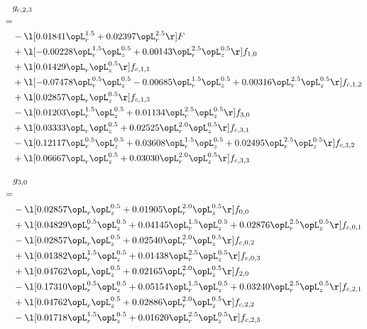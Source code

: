 \begin{alignat}{2} 
\label{eq:g_23_0} 
& g_{c,2,3} \nonumber \\ 
 = \\ 
& - \l[  0.01841 \opL_r^{1.5} +  0.02397 \opL_r^{2.5}  \r] F \nonumber \\ 
& + \l[  -0.00228 \opL_r^{1.5} \opL_z^{0.5} +  0.00143 \opL_r^{2.5} \opL_z^{0.5}  \r] f_{1,0} \nonumber \\ 
& + \l[  0.01429 \opL_r \opL_z^{0.5}  \r] f_{c,1,1} \nonumber \\ 
& + \l[  -0.07478 \opL_r^{0.5} \opL_z^{0.5}   -0.00685 \opL_r^{1.5} \opL_z^{0.5} +  0.00316 \opL_r^{2.5} \opL_z^{0.5}  \r] f_{c,1,2} \nonumber \\ 
& + \l[  0.02857 \opL_r \opL_z^{0.5}  \r] f_{c,1,3} \nonumber \\ 
& - \l[  0.01203 \opL_r^{1.5} \opL_z^{0.5} +  0.01134 \opL_r^{2.5} \opL_z^{0.5}  \r] f_{3,0} \nonumber \\ 
& + \l[  0.03333 \opL_r \opL_z^{0.5} +  0.02525 \opL_r^{2.0} \opL_z^{0.5}  \r] f_{c,3,1} \nonumber \\ 
& - \l[  0.12117 \opL_r^{0.5} \opL_z^{0.5} +  0.03608 \opL_r^{1.5} \opL_z^{0.5} +  0.02495 \opL_r^{2.5} \opL_z^{0.5}  \r] f_{c,3,2} \nonumber \\ 
& + \l[  0.06667 \opL_r \opL_z^{0.5} +  0.03030 \opL_r^{2.0} \opL_z^{0.5}  \r] f_{c,3,3} \nonumber \\ 
\end{alignat} 


\begin{alignat}{2} 
\label{eq:g_30_0} 
& g_{3,0} \nonumber \\ 
 = \\ 
& - \l[  0.02857 \opL_r \opL_z^{0.5} +  0.01905 \opL_r^{2.0} \opL_z^{0.5}  \r] f_{0,0} \nonumber \\ 
& + \l[  0.04829 \opL_r^{0.5} \opL_z^{0.5} +  0.04145 \opL_r^{1.5} \opL_z^{0.5} +  0.02876 \opL_r^{2.5} \opL_z^{0.5}  \r] f_{c,0,1} \nonumber \\ 
& - \l[  0.02857 \opL_r \opL_z^{0.5} +  0.02540 \opL_r^{2.0} \opL_z^{0.5}  \r] f_{c,0,2} \nonumber \\ 
& + \l[  0.01382 \opL_r^{1.5} \opL_z^{0.5} +  0.01438 \opL_r^{2.5} \opL_z^{0.5}  \r] f_{c,0,3} \nonumber \\ 
& + \l[  0.04762 \opL_r \opL_z^{0.5} +  0.02165 \opL_r^{2.0} \opL_z^{0.5}  \r] f_{2,0} \nonumber \\ 
& - \l[  0.17310 \opL_r^{0.5} \opL_z^{0.5} +  0.05154 \opL_r^{1.5} \opL_z^{0.5} +  0.03240 \opL_r^{2.5} \opL_z^{0.5}  \r] f_{c,2,1} \nonumber \\ 
& + \l[  0.04762 \opL_r \opL_z^{0.5} +  0.02886 \opL_r^{2.0} \opL_z^{0.5}  \r] f_{c,2,2} \nonumber \\ 
& - \l[  0.01718 \opL_r^{1.5} \opL_z^{0.5} +  0.01620 \opL_r^{2.5} \opL_z^{0.5}  \r] f_{c,2,3} \nonumber \\ 
\end{alignat} 


